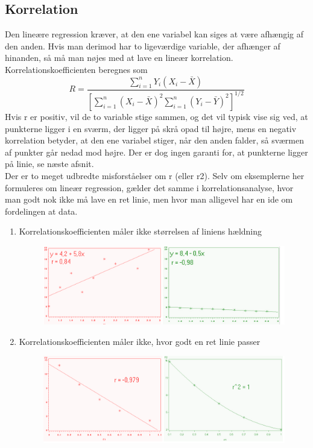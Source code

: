 \documentclass[11pt]{article}
\begin{document}
\subsection{Korrelation}
Den lineære regression kræver, at den ene variabel kan siges at være afhængig af den anden. Hvis man derimod har to ligeværdige variable, der afhænger af hinanden, så må man nøjes med at lave en lineær korrelation. Korrelationskoefficienten beregnes som
$$R=\frac{\sum_{i=1}^nY_i(X_i-\bar{X})}{\left[\sum^n_{i=1}(X_i-\bar{X})^2\sum^n_{i=1}(Y_i-\bar{Y})^2\right]^{1/2}}$$
Hvis r er positiv, vil de to variable stige sammen, og det vil typisk vise sig ved, at punkterne ligger i en sværm, der ligger på skrå opad til højre, mens en negativ korrelation betyder, at den ene variabel stiger, når den anden falder, så sværmen af punkter går nedad mod højre. Der er dog ingen garanti for, at punkterne ligger på linie, se næste afsnit.\\[0.2cm]
Der er to meget udbredte misforståelser om r (eller r2). Selv om eksemplerne her formuleres om lineær regression, gælder det samme i korrelationsanalyse, hvor man godt nok ikke må lave en ret linie, men hvor man alligevel har en ide om fordelingen at data.
\begin{enumerate}\itemsep-2pt
\item Korrelationskoefficienten måler ikke størrelsen af liniens hældning
\begin{figure}[H]
\centering
\includegraphics[scale=0.5]{img/Selection_018}
\end{figure}
\item Korrelationskoefficienten måler ikke, hvor godt en ret linie passer
\begin{figure}[H]
\centering
\includegraphics[scale=0.5]{img/Selection_019}
\end{figure}
\end{enumerate}
\end{document}
